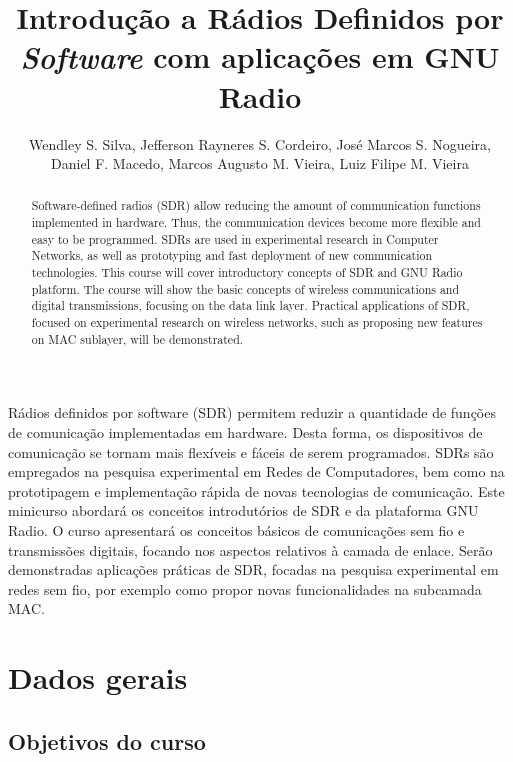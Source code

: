 \documentclass{SBCbookchapter}
\title{Introdução a Rádios Definidos por \textit{Software} com aplica\c{c}ões em GNU Radio}
\author{Wendley S. Silva, Jefferson Rayneres S. Cordeiro, José Marcos S. Nogueira, Daniel F. Macedo, Marcos Augusto M. Vieira, Luiz Filipe M. Vieira}
\begin{document}
\maketitle

\begin{abstract}
Software-defined radios (SDR) allow reducing the amount of
communication functions implemented in hardware. Thus, the
communication devices become more flexible and easy to be
programmed. SDRs are used in experimental research in Computer
Networks, as well as prototyping and fast deployment of new
communication technologies. This course will cover introductory
concepts of SDR and GNU Radio platform. The course will show the
basic concepts of wireless communications and digital transmissions,
focusing on the data link layer. Practical applications of SDR,
focused on experimental research on wireless networks, such as
proposing new features on MAC sublayer, will be demonstrated.
\end{abstract}

\begin{resumo}
\begin{otherlanguage}{brazilian}
Rádios definidos por software (SDR) permitem reduzir a quantidade de funções de comunicação implementadas em hardware. Desta forma, os dispositivos de comunicação se tornam mais flexíveis e fáceis de serem programados. SDRs são empregados na pesquisa experimental em Redes de Computadores, bem como na prototipagem e implementação rápida de novas tecnologias de comunicação. Este minicurso abordará os conceitos introdutórios de SDR e da plataforma GNU Radio.  O curso apresentará os conceitos básicos de comunicações sem fio e transmissões digitais, focando nos aspectos relativos à camada de enlace. Serão demonstradas aplicações práticas de SDR, focadas na pesquisa experimental em redes sem fio, por exemplo como propor novas funcionalidades na subcamada MAC.

\end{otherlanguage}
\end{resumo}

\section{Dados gerais}
\subsection{Objetivos do curso}
\end{document}
